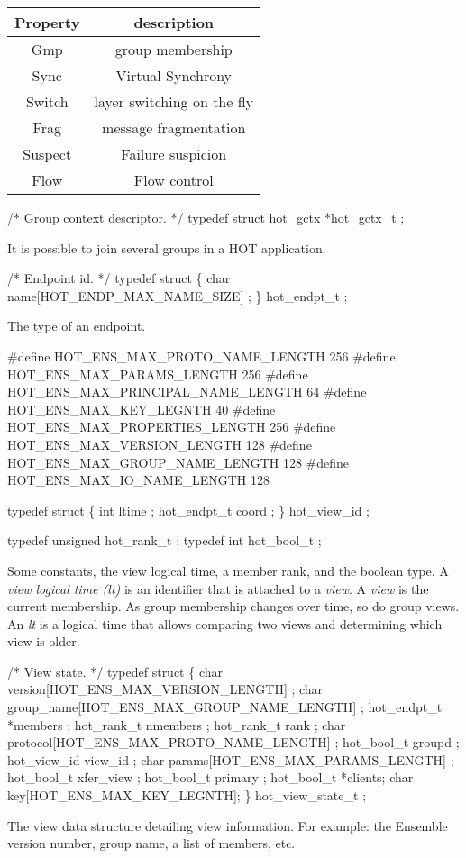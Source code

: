 \begin{tabular}{|c|c|} \hline
Property & description \\ \hline
Gmp & group membership \\
Sync & Virtual Synchrony \\
Switch & layer switching on the fly \\
Frag & message fragmentation  \\
Suspect & Failure suspicion \\ 
Flow & Flow control \\ \hline
\end{tabular}

\begin{codebox}
/* Group context descriptor.
 */
typedef struct hot_gctx *hot_gctx_t ;
\end{codebox}
It is possible to join several groups in a HOT application.

\begin{codebox}
/* Endpoint id.
 */
typedef struct \{ 
  char name[HOT_ENDP_MAX_NAME_SIZE] ; 
\} hot_endpt_t ;
\end{codebox}
The type of an endpoint.

\begin{codebox}
#define HOT_ENS_MAX_PROTO_NAME_LENGTH 256
#define HOT_ENS_MAX_PARAMS_LENGTH 256
#define HOT_ENS_MAX_PRINCIPAL_NAME_LENGTH 64
#define HOT_ENS_MAX_KEY_LEGNTH     40
#define HOT_ENS_MAX_PROPERTIES_LENGTH 256
#define HOT_ENS_MAX_VERSION_LENGTH 128
#define HOT_ENS_MAX_GROUP_NAME_LENGTH 128
#define HOT_ENS_MAX_IO_NAME_LENGTH 128

typedef struct \{
  int ltime ;
  hot_endpt_t coord ;
\} hot_view_id ;

typedef unsigned hot_rank_t ;
typedef int hot_bool_t ;
\end{codebox}
Some constants, the view logical time, a member rank, and the boolean
type. A {\it view logical time (lt)} is an identifier that is attached to a
{\it view}. A {\it view} is the current membership. As group
membership changes over time, so do group views. An {\it lt} is a logical
time that allows comparing two views and determining which view is
older. 


\begin{codebox}
/* View state.
 */
typedef struct \{
  char version[HOT_ENS_MAX_VERSION_LENGTH] ;
  char group_name[HOT_ENS_MAX_GROUP_NAME_LENGTH] ;
  hot_endpt_t *members ;
  hot_rank_t nmembers ;
  hot_rank_t rank ;
  char protocol[HOT_ENS_MAX_PROTO_NAME_LENGTH] ;
  hot_bool_t groupd ;
  hot_view_id view_id ;
  char params[HOT_ENS_MAX_PARAMS_LENGTH] ;
  hot_bool_t xfer_view ;
  hot_bool_t primary ;
  hot_bool_t *clients;
  char key[HOT_ENS_MAX_KEY_LEGNTH];
\} hot_view_state_t ;
\end{codebox}
The view data structure detailing view information. For example: the
Ensemble version number, group name, a list of members, etc. 


